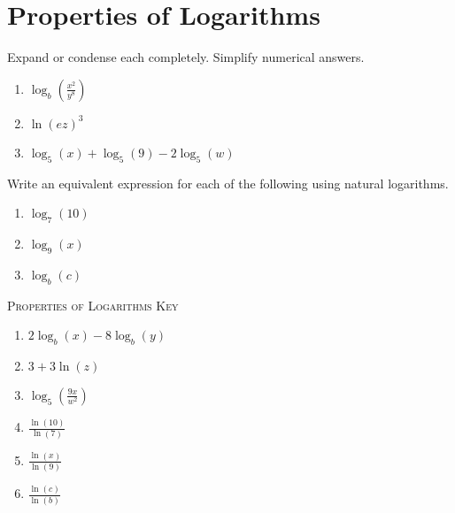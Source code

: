 \chapter{Properties of Logarithms}

Expand or condense each completely. Simplify numerical answers.
\begin{enumerate}
	\item $\log_b\left(\frac{x^2}{y^8}\right)$
	\item $\ln\left(ez\right)^3$
	\item $\log_5(x) + \log_5(9) - 2\log_5(w)$
\setcounter{Review}{\value{enumi}}
\end{enumerate}

Write an equivalent expression for each of the following using natural logarithms.
\begin{enumerate}
\setcounter{enumi}{\value{Review}}
	\item $\log_7(10)$
	\item $\log_9(x)$
	\item $\log_b(c)$
\setcounter{Review}{\value{enumi}}
\end{enumerate}

\newpage

\textsc{Properties of Logarithms Key}

\begin{enumerate}
	\item $2\log_b(x) - 8\log_b(y)$
    \item $3 + 3\ln(z)$
    \item $\log_5\left(\frac{9x}{w^2}\right)$
    \item $\frac{\ln(10)}{\ln(7)}$
    \item $\frac{\ln(x)}{\ln(9)}$
    \item $\frac{\ln(c)}{\ln(b)}$
\end{enumerate}